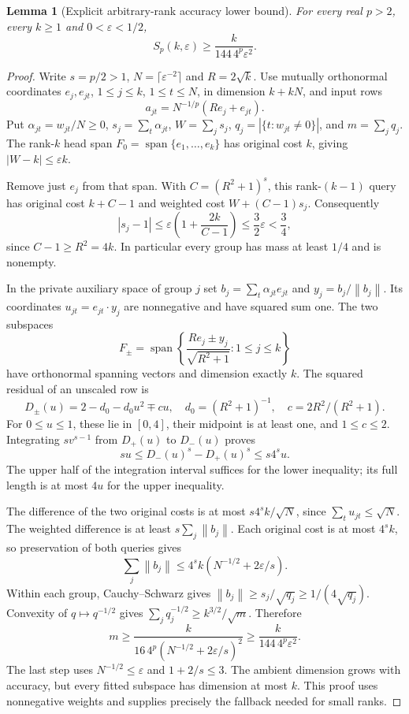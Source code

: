 \documentclass[11pt]{article}
\newtheorem{lemma}[theorem]{Lemma}
\theoremstyle{remark}\newtheorem{remark}[theorem]{Remark}
\newcommand{\eps}{\varepsilon}\newcommand{\norm}[1]{\left\|#1\right\|}
\begin{document}
\begin{lemma}[Explicit arbitrary-rank accuracy lower bound]\label{lem:block}
For every real $p>2$, every $k\ge1$ and $0<\eps<1/2$,
\begin{equation}\label{eq:blocklower}
 S_p(k,\eps)\ge\frac{k}{144\,4^p\eps^2}.
\end{equation}
\end{lemma}
\begin{proof}
Write $s=p/2>1$, $N=\lceil\eps^{-2}\rceil$ and $R=2\sqrt k$. Use mutually orthonormal coordinates $e_j,e_{jt}$, $1\le j\le k$, $1\le t\le N$, in dimension $k+kN$, and input rows
\[
 a_{jt}=N^{-1/p}(Re_j+e_{jt}).
\]
Put $\alpha_{jt}=w_{jt}/N\ge0$, $s_j=\sum_t\alpha_{jt}$, $W=\sum_js_j$, $q_j=|\{t:w_{jt}\ne0\}|$, and $m=\sum_jq_j$. The rank-$k$ head span $F_0=\operatorname{span}\{e_1,\ldots,e_k\}$ has original cost $k$, giving $|W-k|\le\eps k$.

Remove just $e_j$ from that span. With $C=(R^2+1)^s$, this rank-$(k-1)$ query has original cost $k+C-1$ and weighted cost $W+(C-1)s_j$. Consequently
\[
 |s_j-1|\le\eps\left(1+\frac{2k}{C-1}\right)
 \le\frac32\eps<\frac34,
\]
since $C-1\ge R^2=4k$. In particular every group has mass at least $1/4$ and is nonempty.

In the private auxiliary space of group $j$ set $b_j=\sum_t\alpha_{jt}e_{jt}$ and $y_j=b_j/\norm{b_j}$. Its coordinates $u_{jt}=e_{jt}\cdot y_j$ are nonnegative and have squared sum one. The two subspaces
\[
 F_\pm=\operatorname{span}\left\{
 \frac{Re_j\pm y_j}{\sqrt{R^2+1}}:1\le j\le k\right\}
\]
have orthonormal spanning vectors and dimension exactly $k$. The squared residual of an unscaled row is
\[
 D_\pm(u)=2-d_0-d_0u^2\mp cu,
 \quad d_0=(R^2+1)^{-1},\quad c=2R^2/(R^2+1).
\]
For $0\le u\le1$, these lie in $[0,4]$, their midpoint is at least one, and $1\le c\le2$. Integrating $sv^{s-1}$ from $D_+(u)$ to $D_-(u)$ proves
\[
 su\le D_-(u)^s-D_+(u)^s\le s4^su.
\]
The upper half of the integration interval suffices for the lower inequality; its full length is at most $4u$ for the upper inequality.

The difference of the two original costs is at most $s4^sk/\sqrt N$, since $\sum_tu_{jt}\le\sqrt N$. The weighted difference is at least $s\sum_j\norm{b_j}$. Each original cost is at most $4^sk$, so preservation of both queries gives
\[
 \sum_j\norm{b_j}\le4^sk(N^{-1/2}+2\eps/s).
\]
Within each group, Cauchy--Schwarz gives $\norm{b_j}\ge s_j/\sqrt{q_j}\ge1/(4\sqrt{q_j})$. Convexity of $q\mapsto q^{-1/2}$ gives $\sum_jq_j^{-1/2}\ge k^{3/2}/\sqrt m$. Therefore
\[
 m\ge\frac{k}{16\,4^p(N^{-1/2}+2\eps/s)^2}
 \ge\frac{k}{144\,4^p\eps^2}.
\]
The last step uses $N^{-1/2}\le\eps$ and $1+2/s\le3$. The ambient dimension grows with accuracy, but every fitted subspace has dimension at most $k$. This proof uses nonnegative weights and supplies precisely the fallback needed for small ranks.
\end{proof}
\end{document}

